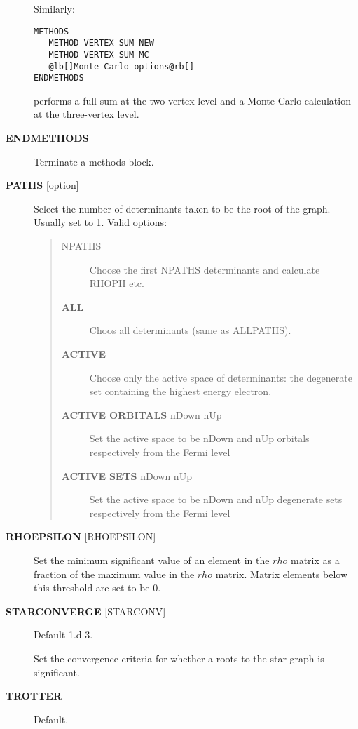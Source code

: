 \documentclass[openany,a4paper,10pt]{manual}
\begin{document}
\begin{description}
Similarly:

\begin{Verbatim}[commandchars=@\[\]]
METHODS
   METHOD VERTEX SUM NEW
   METHOD VERTEX SUM MC
   @lb[]Monte Carlo options@rb[]
ENDMETHODS
\end{Verbatim}

performs a full sum at the two-vertex level and a Monte Carlo
calculation at the three-vertex level.

\item[\textbf{ENDMETHODS}]
Terminate a methods block.

\item[\textbf{PATHS} {[}option{]}]
Select the number of determinants taken to be the root of the graph.
Usually set to 1.  Valid options:
\begin{quote}
\begin{description}
\item[NPATHS]
Choose the first NPATHS determinants and calculate RHOPII etc.

\item[\textbf{ALL}]
Choos all determinants (same as ALLPATHS).

\item[\textbf{ACTIVE}]
Choose only the active space of determinants: the degenerate
set containing the highest energy electron.

\item[\textbf{ACTIVE} \textbf{ORBITALS} nDown nUp]
Set the active space to be nDown and nUp orbitals respectively
from the Fermi level

\item[\textbf{ACTIVE} \textbf{SETS} nDown nUp]
Set the active space to be nDown and nUp degenerate sets
respectively from the Fermi level

\end{description}
\end{quote}

\item[\textbf{RHOEPSILON} {[}RHOEPSILON{]}]
Set the minimum significant value of an element in the $rho$
matrix as a fraction of the maximum value in the $rho$ matrix.
Matrix elements below this threshold are set to be 0.

\item[\textbf{STARCONVERGE} {[}STARCONV{]}]
Default 1.d-3.

Set the convergence criteria for whether a roots to the star graph
is significant.

\item[\textbf{TROTTER}]
Default.


\end{description}
\end{document}
